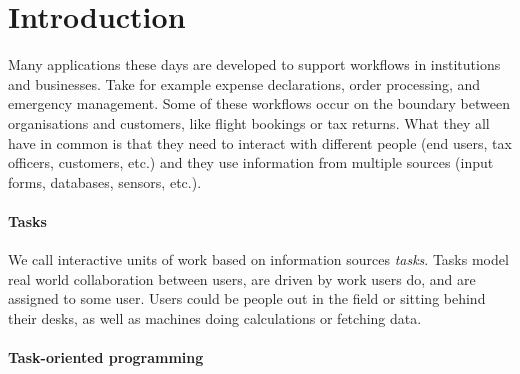 


\section{Introduction}


Many applications these days are developed to support workflows in institutions and businesses.
Take for example expense declarations, order processing, and emergency management.
Some of these workflows occur on the boundary between organisations and customers,
like flight bookings or tax returns.
What they all have in common is
that they need to interact with different people (end users, tax officers, customers, etc.)
and they use information from multiple sources (input forms, databases, sensors, etc.).

\paragraph{Tasks}

We call interactive units of work based on information sources \emph{tasks}.
Tasks model real world collaboration between users,
are driven by work users do,
and are assigned to some user.
Users could be people out in the field or sitting behind their desks,
as well as machines doing calculations or fetching data.



\paragraph{Task-oriented programming}
\label{sec:top}



